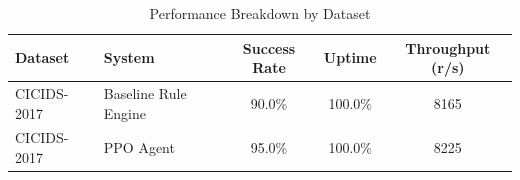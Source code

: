 \begin{table}[h]
\caption{Performance Breakdown by Dataset}
\label{tab:dataset_breakdown}
\centering
\begin{tabular}{@{}llccc@{}}
\toprule
\textbf{Dataset} & \textbf{System} & \textbf{Success Rate} & \textbf{Uptime} & \textbf{Throughput (r/s)} \\ \midrule
CICIDS-2017 & Baseline Rule Engine & 90.0\% & 100.0\% & 8165 \\
CICIDS-2017 & PPO Agent & 95.0\% & 100.0\% & 8225 \\
\bottomrule
\end{tabular}
\end{table}
